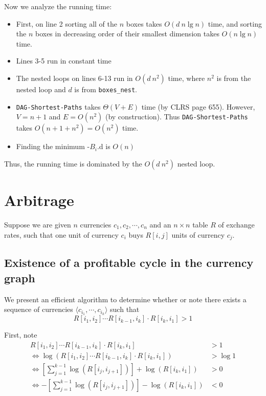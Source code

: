 \documentclass[paper=a4, fontsize=11pt]{scrartcl} %
\numberwithin{equation}{section} %
\numberwithin{figure}{section} %
\numberwithin{table}{section} %
\begin{document}
Now we analyze the running time:
\begin{itemize}
\item First, on line 2 sorting all of the $n$ boxes takes $O(d ~ n \lg n)$ time, and sorting the $n$ boxes in decreasing order of their smallest dimension takes $O(n \lg n)$ time.
\item Lines 3-5 run in constant time
\item The nested loops on lines 6-13 run in $O(d ~ n^2) $ time, where $n^2$ is from the nested loop and $d$ is from \texttt{boxes\_nest}.
\item \texttt{DAG-Shortest-Paths} takes $\Theta(V + E)$ time (by CLRS page 655). However, $V = n + 1$ and $E = O(n^2)$ (by construction). Thus \texttt{DAG-Shortest-Paths} takes $O(n + 1 + n^2) = O(n^2)$ time. 
\item Finding the minimum -$B_i$.d is $O(n)$
\end{itemize}

Thus, the running time is dominated by the $O(d ~ n^2)$ nested loop.


\section{Arbitrage}

Suppose we are given $n$ currencies $c_1, c_2, \cdots, c_n$ and an $n \times n$ table $R$ of exchange rates, such that one unit of currency $c_i$ buys $R[i, j]$ units of currency $c_j$. 

\subsection{Existence of a profitable cycle in the currency graph}

We present an efficient algorithm to determine whether or note there exists a sequence of currencies $\langle c_{i_1}, \cdots, c_{i_k}\rangle$ such that
\[R[i_1, i_2] \cdots R[i_{k-1}, i_k] \cdot R[i_k, i_1] >1\]

First, note
\begin{align*}
R[i_1, i_2] \cdots R[i_{k-1}, i_k] \cdot R[i_k, i_1] &> 1 \\
\iff \log \left(R[i_1, i_2] \cdots R[i_{k-1}, i_k] \cdot R[i_k, i_1]\right) &> \log 1 \\
\iff \left[\sum_{j = 1}^{k-1} \log \left(R[i_j, i_{j+1}]\right)\right] + \log \left(R[i_k, i_1]\right) &> 0 \\
\iff -\left[\sum_{j = 1}^{k-1} \log \left(R[i_j, i_{j+1}]\right)\right] - \log \left(R[i_k, i_1]\right) &< 0 \\
\end{align*}
\end{document}
